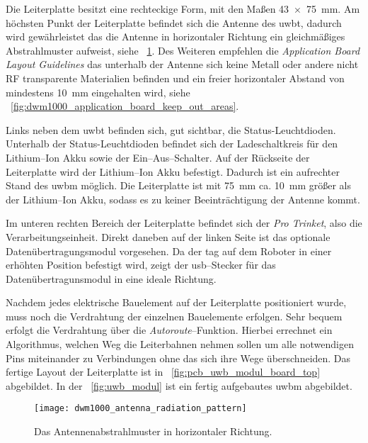 Die Leiterplatte besitzt eine rechteckige Form, mit den Maßen \SI{43 x 75}{\mm}. Am höchsten Punkt der Leiterplatte befindet sich die Antenne des \Gls{uwbt}, dadurch wird gewährleistet das die Antenne in horizontaler Richtung ein gleichmäßiges Abstrahlmuster aufweist, siehe \figurename~\ref{fig:dwm1000_antenna_radiation_pattern}. Des Weiteren empfehlen die \textit{Application Board Layout Guidelines} das unterhalb der Antenne sich keine Metall oder andere nicht RF transparente Materialien befinden und ein freier horizontaler Abstand von mindestens \SI{10}{\mm} eingehalten wird, siehe \figurename~\ref{fig:dwm1000_application_board_keep_out_areas}.

Links neben dem \Gls{uwbt} befinden sich, gut sichtbar, die Status-Leuchtdioden. Unterhalb der Status-Leuchtdioden befindet sich der Ladeschaltkreis für den Lithium--Ion Akku sowie der Ein--Aus--Schalter. Auf der Rückseite der Leiterplatte wird der Lithium--Ion Akku befestigt. Dadurch ist ein aufrechter Stand des \Gls{uwbm} möglich. Die Leiterplatte ist mit \SI{75}{\mm} ca. \SI{10}{\mm} größer als der Lithium--Ion Akku, sodass es zu keiner Beeinträchtigung der Antenne kommt.

Im unteren rechten Bereich der Leiterplatte befindet sich der \textit{Pro Trinket}, also die Verarbeitungseinheit. Direkt daneben auf der linken Seite ist das optionale Datenübertragungsmodul vorgesehen. Da der \Gls{tag} auf dem Roboter in einer erhöhten Position befestigt wird, zeigt der \Gls{usb}--Stecker für das Datenübertragunsmodul in eine ideale Richtung.

Nachdem jedes elektrische Bauelement auf der Leiterplatte positioniert wurde, muss noch die Verdrahtung der einzelnen Bauelemente erfolgen. Sehr bequem erfolgt die Verdrahtung über die \textit{Autoroute}--Funktion. Hierbei errechnet ein Algorithmus, welchen Weg die Leiterbahnen nehmen sollen um alle notwendigen Pins miteinander zu Verbindungen ohne das sich ihre Wege überschneiden. Das fertige Layout der Leiterplatte ist in \figurename~\ref{fig:pcb_uwb_modul_board_top} abgebildet. In der \figurename~\ref{fig:uwb_modul} ist ein fertig aufgebautes \Gls{uwbm} abgebildet.

\begin{figure}
	\centering
	\texttt{[image: dwm1000\_antenna\_radiation\_pattern]}
	\caption{Das Antennenabstrahlmuster in horizontaler Richtung.}
	\label{fig:dwm1000_antenna_radiation_pattern}
\end{figure}
	
